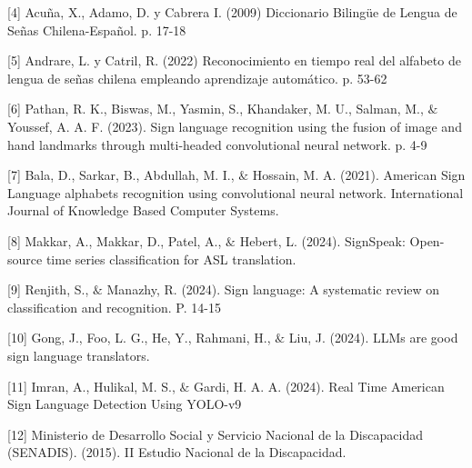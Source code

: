 \documentclass[10pt]{article}
\begin{document}
\vspace{1\baselineskip}
[4] Acuña, X., Adamo, D. y Cabrera I. (2009) Diccionario Bilingüe de Lengua de Señas Chilena-Español. p. 17-18

\vspace{1\baselineskip}
[5] Andrare, L. y Catril, R. (2022) Reconocimiento en tiempo real del alfabeto de lengua de señas chilena empleando aprendizaje automático. p. 53-62

\vspace{1\baselineskip}
[6] Pathan, R. K., Biswas, M., Yasmin, S., Khandaker, M. U., Salman, M., $\&$ Youssef, A. A. F. (2023). Sign language recognition using the fusion of image and hand landmarks through multi-headed convolutional neural network. p. 4-9

\vspace{1\baselineskip}
[7] Bala, D., Sarkar, B., Abdullah, M. I., $\&$ Hossain, M. A. (2021). American Sign Language alphabets recognition using convolutional neural network. International Journal of Knowledge Based Computer Systems.

\vspace{1\baselineskip}
[8] Makkar, A., Makkar, D., Patel, A., $\&$ Hebert, L. (2024). SignSpeak: Open-source time series classification for ASL translation.

\vspace{1\baselineskip}
[9] Renjith, S., $\&$ Manazhy, R. (2024). Sign language: A systematic review on classification and recognition. P. 14-15

\vspace{1\baselineskip}
[10] Gong, J., Foo, L. G., He, Y., Rahmani, H., $\&$ Liu, J. (2024). LLMs are good sign language translators. 

[11] Imran, A., Hulikal, M. S., $\&$ Gardi, H. A. A. (2024). Real Time American Sign Language Detection Using YOLO-v9

[12] Ministerio de Desarrollo Social y Servicio Nacional de la Discapacidad (SENADIS). (2015). II Estudio Nacional de la Discapacidad.
\end{document}
